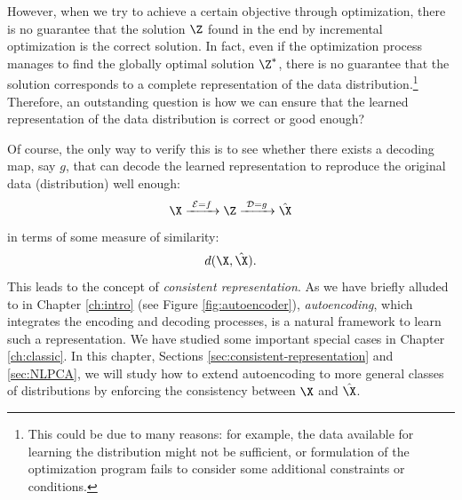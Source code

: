 \documentclass[../../book-main.tex]{subfiles}
\begin{document}
However, when we try to achieve a certain objective through
optimization, there is no guarantee that the solution $\Z$ found in
the end by incremental optimization is the correct solution. In fact, even if
the optimization process manages to find the globally optimal
solution $\Z^*$, there is no guarantee that the solution corresponds
to a complete representation of the data distribution.\footnote{This could be due to many reasons: for example, the data available for learning the distribution might not be sufficient, or formulation of the optimization program fails to consider some additional constraints or conditions.} Therefore, an outstanding question is how we can ensure that the learned representation of the data distribution is
correct or good enough? 

Of course, the only way to verify this is to see whether there exists a decoding map, say $g$, that can decode the learned representation to reproduce the original data (distribution) well enough:
\begin{equation}
  \X
  \xrightarrow{\hspace{1mm} \mathcal{E} = f \hspace{1mm}} \Z
  \xrightarrow{\hspace{1mm} \mathcal{D} = g \hspace{1mm}} \hat{\X}
\end{equation}
in terms of some measure of similarity:
\begin{equation}
  d(\X, \hat \X).
\end{equation}
This leads to the concept of {\em consistent representation}. As we have briefly alluded to in
Chapter \ref{ch:intro} (see Figure \ref{fig:autoencoder}), {\em autoencoding}, which integrates the
encoding and decoding processes, is a natural framework to learn such a representation. We have studied some important special cases in Chapter \ref{ch:classic}. In
this chapter, Sections \ref{sec:consistent-representation} and \ref{sec:NLPCA}, we will study how to extend autoencoding to
more general classes of distributions by enforcing the consistency between $\X$ and $\hat \X$.
\end{document}

